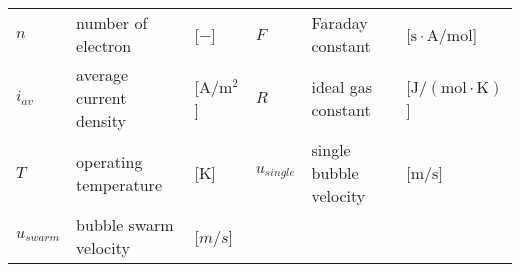 \begin{center}
\begin{tabular}{l l l| l l l}
  $n$ & number of electron & [$-$] & $F$ & Faraday constant & [$\mathrm{s \cdot A / mol}$] \\
  
  $i_{av}$ & average current density & [$\mathrm{A/m^2}$] & $R$ & ideal gas constant & [$\mathrm{J/(mol \cdot K)}$] \\
  
  $T$ & operating temperature & [$ \mathrm{K}$] & $u_{single}$ & single bubble velocity & [$\mathrm{m/s}$] \\
  
  $u_{swarm}$ & bubble swarm velocity & [$m/s$] 
   
  
   
\end{tabular}
\end{center}